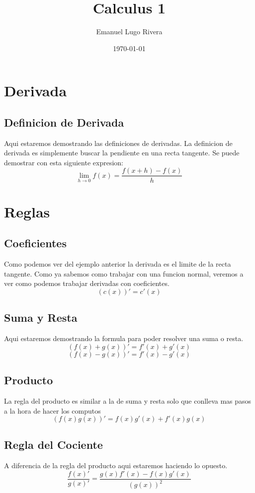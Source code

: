 \documentclass[a4paper,12pt]{article}
\title{Calculus 1}
\author{Emanuel Lugo Rivera}
\date{\today}
\begin{document}
\begin{titlepage}
    \maketitle
\end{titlepage}


\section{Derivada}
\subsection{Definicion de Derivada}
Aqui estaremos demostrando las definiciones de derivadas. La definicion de derivada es simplemente buscar la pendiente en una recta tangente.
Se puede demostrar con esta siguiente expresion:
$$\lim_{h \to 0} f(x) = \frac{f(x+h)-f(x)}{h}$$

\section{Reglas}
\subsection{Coeficientes}
Como podemos ver del ejemplo anterior la derivada es el limite de la recta tangente.
Como ya sabemos como trabajar con una funcion normal, veremos a ver como podemos trabajar derivadas con coeficientes.
$$(c(x))'= c'(x)$$

\subsection{Suma y Resta}
Aqui estaremos demostrando la formula para poder resolver una suma o resta.
$$(f(x)+g(x))' = f'(x)+g'(x)$$
$$(f(x)-g(x))'= f'(x)-g'(x)$$
\subsection{Producto}
La regla del producto es similar a la de suma y resta solo que conlleva mas pasos a la hora de hacer los computos
$$(f(x)g(x))'=f(x)g'(x)+f'(x)g(x)$$
\subsection{Regla del Cociente}
A diferencia de la regla del producto aqui estaremos haciendo lo opuesto.
$$\frac{f(x)'}{g(x)'} = \frac{g(x)f'(x)-f(x)g'(x)}{(g(x))^2}$$
\end{document}
